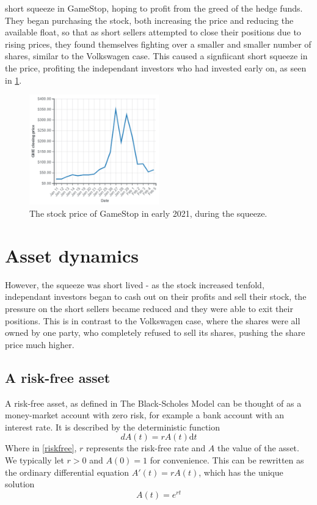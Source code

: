 \documentclass[11pt]{article} %
\begin{document}
short squeeze in GameStop, hoping to profit from the greed of the hedge funds. They 
began purchasing the stock, both increasing the price and reducing the available float, 
so that as short sellers attempted to close their positions due to rising prices, they 
found themselves fighting over a smaller and smaller number of shares, similar to the 
Volkswagen case. This caused a signfiicant short squeeze in the price, profiting the 
independant investors who had invested early on, as seen in \ref{shortsqeeze}.
\begin{figure}[h]
    \centering
    \includegraphics[width=0.5\textwidth]{shortsqueeze.png}
    \caption{The stock price of GameStop in early 2021, during the squeeze.}
    \label{shortsqeeze}
    \end{figure}

\section{Asset dynamics}\label{assetdyamics}
However, the squeeze was short lived - as the stock increased tenfold, independant 
investors began to cash out on their profits and sell their stock, the pressure 
on the short sellers became reduced and they were able to exit their positions. 
This is in contrast to the Volkswagen case, where the shares were all owned by one 
party, who completely refused to sell its shares, pushing the share price much higher.
\subsection{A risk-free asset}
A risk-free asset, as defined in The Black-Scholes Model \cite{blackscholes} can be thought
of as a money-market account with zero risk, for example a bank account with an interest 
rate. It is described by the deterministic function 
\begin{equation} \label{riskfree}
    dA(t) = rA(t)\mathrm{d}t 
\end{equation}
Where in \ref{riskfree}, $r$ represents the risk-free rate and $A$ the value of the 
asset. We typically let $r>0$ and $A(0) = 1$ for convenience. This can be rewritten as 
the ordinary differential equation $A'(t) = rA(t)$, which has the unique solution 
\begin{equation} \label{riskfree solution}
    A(t) =e^{rt}
\end{equation}
\end{document}
